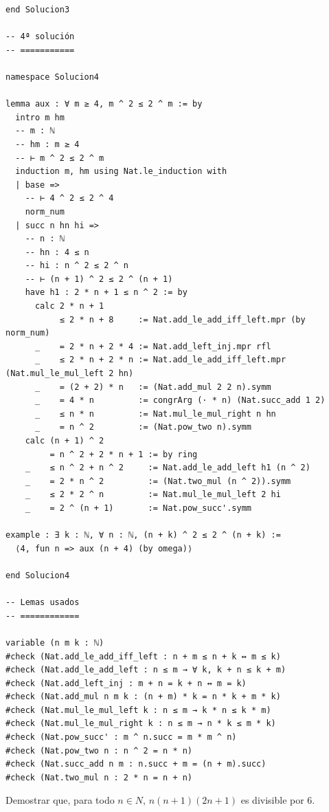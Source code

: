 \begin{verbatim}
end Solucion3

-- 4ª solución
-- ===========

namespace Solucion4

lemma aux : ∀ m ≥ 4, m ^ 2 ≤ 2 ^ m := by
  intro m hm
  -- m : ℕ
  -- hm : m ≥ 4
  -- ⊢ m ^ 2 ≤ 2 ^ m
  induction m, hm using Nat.le_induction with
  | base =>
    -- ⊢ 4 ^ 2 ≤ 2 ^ 4
    norm_num
  | succ n hn hi =>
    -- n : ℕ
    -- hn : 4 ≤ n
    -- hi : n ^ 2 ≤ 2 ^ n
    -- ⊢ (n + 1) ^ 2 ≤ 2 ^ (n + 1)
    have h1 : 2 * n + 1 ≤ n ^ 2 := by
      calc 2 * n + 1
           ≤ 2 * n + 8     := Nat.add_le_add_iff_left.mpr (by norm_num)
      _    = 2 * n + 2 * 4 := Nat.add_left_inj.mpr rfl
      _    ≤ 2 * n + 2 * n := Nat.add_le_add_iff_left.mpr (Nat.mul_le_mul_left 2 hn)
      _    = (2 + 2) * n   := (Nat.add_mul 2 2 n).symm
      _    = 4 * n         := congrArg (· * n) (Nat.succ_add 1 2)
      _    ≤ n * n         := Nat.mul_le_mul_right n hn
      _    = n ^ 2         := (Nat.pow_two n).symm
    calc (n + 1) ^ 2
         = n ^ 2 + 2 * n + 1 := by ring
    _    ≤ n ^ 2 + n ^ 2     := Nat.add_le_add_left h1 (n ^ 2)
    _    = 2 * n ^ 2         := (Nat.two_mul (n ^ 2)).symm
    _    ≤ 2 * 2 ^ n         := Nat.mul_le_mul_left 2 hi
    _    = 2 ^ (n + 1)       := Nat.pow_succ'.symm

example : ∃ k : ℕ, ∀ n : ℕ, (n + k) ^ 2 ≤ 2 ^ (n + k) :=
  ⟨4, fun n => aux (n + 4) (by omega)⟩

end Solucion4

-- Lemas usados
-- ============

variable (n m k : ℕ)
#check (Nat.add_le_add_iff_left : n + m ≤ n + k ↔ m ≤ k)
#check (Nat.add_le_add_left : n ≤ m → ∀ k, k + n ≤ k + m)
#check (Nat.add_left_inj : m + n = k + n ↔ m = k)
#check (Nat.add_mul n m k : (n + m) * k = n * k + m * k)
#check (Nat.mul_le_mul_left k : n ≤ m → k * n ≤ k * m)
#check (Nat.mul_le_mul_right k : n ≤ m → n * k ≤ m * k)
#check (Nat.pow_succ' : m ^ n.succ = m * m ^ n)
#check (Nat.pow_two n : n ^ 2 = n * n)
#check (Nat.succ_add n m : n.succ + m = (n + m).succ)
#check (Nat.two_mul n : 2 * n = n + n)
\end{verbatim}

\begin{ejercicio}
Demostrar que, para todo \(n ∈ N\), \(n(n+1)(2n+1)\) es divisible
por 6.
\end{ejercicio}

